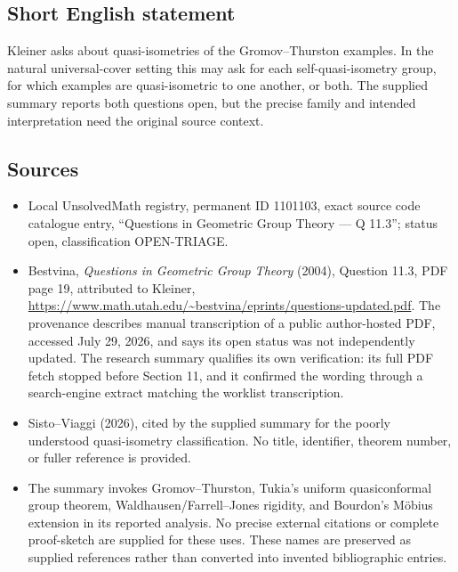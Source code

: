 \documentclass[11pt]{article}
\begin{document}
\subsection{Short English statement}
Kleiner asks about quasi-isometries of the Gromov--Thurston examples. In the natural universal-cover setting this may ask for each self-quasi-isometry group, for which examples are quasi-isometric to one another, or both. The supplied summary reports both questions open, but the precise family and intended interpretation need the original source context.
\subsection{Sources}
\begin{itemize}
\item Local UnsolvedMath registry, permanent ID 1101103, exact source code catalogue entry, ``Questions in Geometric Group Theory --- Q 11.3''; status open, classification OPEN-TRIAGE.
\item Bestvina, \emph{Questions in Geometric Group Theory} (2004), Question 11.3, PDF page 19, attributed to Kleiner, \url{https://www.math.utah.edu/~bestvina/eprints/questions-updated.pdf}. The provenance describes manual transcription of a public author-hosted PDF, accessed July 29, 2026, and says its open status was not independently updated. The research summary qualifies its own verification: its full PDF fetch stopped before Section 11, and it confirmed the wording through a search-engine extract matching the worklist transcription.
\item Sisto--Viaggi (2026), cited by the supplied summary for the poorly understood quasi-isometry classification. No title, identifier, theorem number, or fuller reference is provided.
\item The summary invokes Gromov--Thurston, Tukia's uniform quasiconformal group theorem, Waldhausen/Farrell--Jones rigidity, and Bourdon's M\"obius extension in its reported analysis. No precise external citations or complete proof-sketch are supplied for these uses. These names are preserved as supplied references rather than converted into invented bibliographic entries.
\end{itemize}
\end{document}
